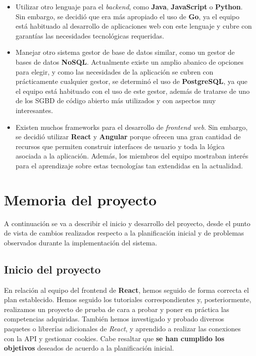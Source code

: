 \documentclass[11pt, a4paper, titlepage]{article}
\begin{document}
\begin{itemize}
    \item Utilizar otro lenguaje para el \textit{backend}, como \textbf{Java}, \textbf{JavaScript} o \textbf{Python}. Sin embargo, se decidió que era más apropiado el uso de \textbf{Go}, ya el equipo está habituado al desarrollo de aplicaciones web con este lenguaje y cubre con garantías las necesidades tecnológicas requeridas.
    
    \item  Manejar otro sistema gestor de base de datos similar, como un gestor de bases de datos \textbf{NoSQL}. Actualmente existe un amplio abanico de opciones para elegir, y como las necesidades de la aplicación se cubren con prácticamente cualquier gestor, se determinó el uso de \textbf{PostgreSQL}, ya que el equipo está habituado con el uso de este gestor, además de tratarse de uno de los SGBD de código abierto más utilizados y con aspectos muy interesantes. 
    
    \item Existen muchos frameworks para el desarrollo de \textit{frontend web}. Sin embargo, se decidió utilizar  \textbf{React} y \textbf{Angular} porque ofrecen una gran cantidad de recursos que permiten construir interfaces de usuario y toda la lógica asociada a la aplicación. Además, los miembros del equipo mostraban interés para el aprendizaje sobre estas tecnologías tan extendidas en la actualidad.
\end{itemize}

\section{Memoria del proyecto}

A continuación se va a describir el inicio y desarrollo del proyecto, desde el punto de vista de cambios realizados respecto a la planificación inicial y de problemas observados durante la implementación del sistema.

\subsection{Inicio del proyecto}
En relación al equipo del frontend de \textbf{React}, hemos seguido de forma correcta el plan establecido. Hemos seguido los tutoriales correspondientes y, posteriormente, realizamos un proyecto de prueba de cara a probar y poner en práctica las competencias adquiridas. También hemos investigado y probado diversos paquetes o librerías adicionales de \textit{React}, y aprendido a realizar las conexiones con la API y gestionar cookies. Cabe resaltar que \textbf{se han cumplido los objetivos} deseados de acuerdo a la planificación inicial. 
\end{document}
